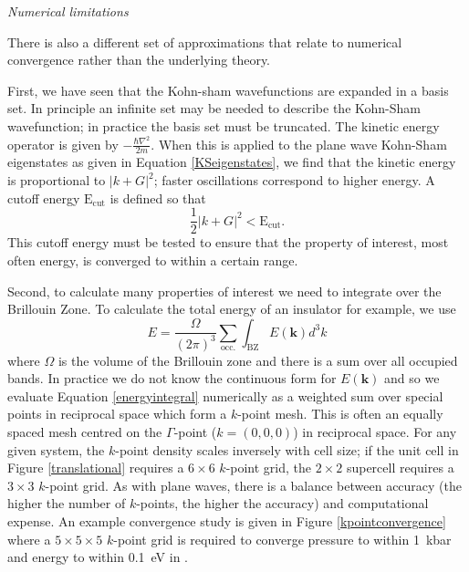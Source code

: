 \textit{Numerical limitations}

There is also a different set of approximations that relate to  numerical convergence rather than the underlying theory.

First, we have seen that the Kohn-sham wavefunctions are expanded in a basis set. In principle an infinite set may be needed to describe the Kohn-Sham wavefunction; in practice the basis set must be truncated. The kinetic energy operator is given by $-\frac{\hbar \nabla^2}{2m}$. When this is applied to the plane wave Kohn-Sham eigenstates as given in Equation \ref{KSeigenstates}, we find that the kinetic energy is proportional to $|k+G|^2$; faster oscillations correspond to higher energy. A cutoff energy $\textrm{E}_\textrm{cut}$ is defined so that
\begin{equation}
\frac{1}{2}|k+G|^2 < \textrm{E}_\textrm{cut}.
\end{equation}
This cutoff energy must be tested to ensure that the property of interest, most often energy, is converged to within a certain range.

Second, to calculate many properties of interest we need to integrate over the Brillouin Zone. To calculate the total energy of an insulator for example, we use
\begin{equation} \label{energyintegral}
    E = \frac{\Omega}{(2\pi)^3}\sum_\textrm{occ.}\int_\textrm{BZ}E(\textbf{k})d^3k
\end{equation}
where $\Omega$ is the volume of the Brillouin zone and there is a sum over all occupied bands. 
In practice we do not know the continuous form for $E(\textbf{k})$ and so we evaluate Equation \ref{energyintegral} numerically as a weighted sum over special points in reciprocal space which form a $k$-point mesh. This is often an equally spaced mesh centred on the $\Gamma$-point ($k=(0,0,0)$) in reciprocal space. For any given system, the $k$-point density scales inversely with cell size; if the unit cell in Figure \ref{translational} requires a $6\times6$ $k$-point grid, the $2\times2$ supercell requires a $3\times3$ $k$-point grid. As with plane waves, there is a balance between accuracy (the higher the number of $k$-points, the higher the accuracy) and computational expense. An example convergence study is given in Figure \ref{kpointconvergence} where a $5\times5\times5$ $k$-point grid is required to converge pressure to within \SI{1}{\kilo\bar} and energy to within \SI{0.1}{\electronvolt} in .

